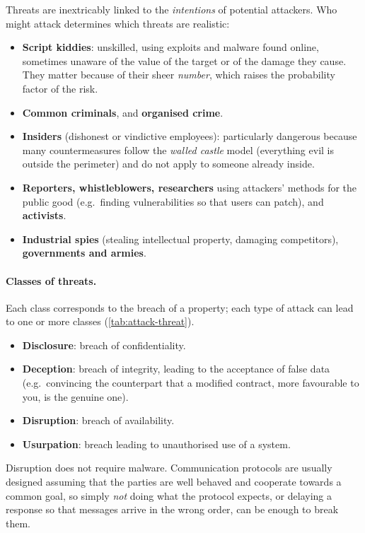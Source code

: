 Threats are inextricably linked to the \emph{intentions} of potential attackers. Who might attack determines which threats are realistic:
\begin{itemize}
    \item \textbf{Script kiddies}: unskilled, using exploits and malware found online, sometimes unaware of the value of the target or of the damage they cause. They matter because of their sheer \emph{number}, which raises the probability factor of the risk.
    \item \textbf{Common criminals}, and \textbf{organised crime}.
    \item \textbf{Insiders} (dishonest or vindictive employees): particularly dangerous because many countermeasures follow the \emph{walled castle} model (everything evil is outside the perimeter) and do not apply to someone already inside.
    \item \textbf{Reporters, whistleblowers, researchers} using attackers' methods for the public good (e.g.\ finding vulnerabilities so that users can patch), and \textbf{activists}.
    \item \textbf{Industrial spies} (stealing intellectual property, damaging competitors), \textbf{governments and armies}.
\end{itemize}

\paragraph{Classes of threats.} Each class corresponds to the breach of a property; each type of attack can lead to one or more classes (\cref{tab:attack-threat}).

\begin{itemize}
    \item \textbf{Disclosure}: breach of confidentiality.
    \item \textbf{Deception}: breach of integrity, leading to the acceptance of false data (e.g.\ convincing the counterpart that a modified contract, more favourable to you, is the genuine one).
    \item \textbf{Disruption}: breach of availability.
    \item \textbf{Usurpation}: breach leading to unauthorised use of a system.
\end{itemize}

\begin{remark}
Disruption does not require malware. Communication protocols are usually designed assuming that the parties are well behaved and cooperate towards a common goal, so simply \emph{not} doing what the protocol expects, or delaying a response so that messages arrive in the wrong order, can be enough to break them.
\end{remark}

